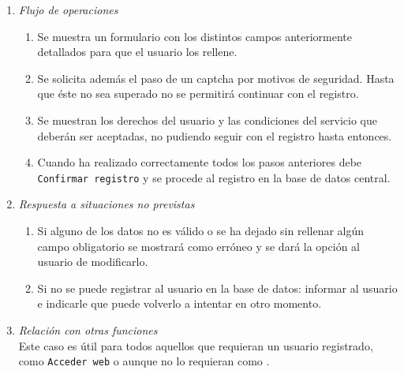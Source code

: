 \begin{enumerate}
		\item \textit{Flujo de operaciones}
			\begin{enumerate}
				\item Se muestra un formulario con los distintos campos anteriormente detallados para que el usuario los rellene. 
				\item Se solicita además el paso de un \gls{captcha} por motivos de seguridad. Hasta que éste no sea superado no se permitirá continuar con el registro.
				\item Se muestran los derechos del usuario y las condiciones del servicio que deberán ser aceptadas, no pudiendo seguir con el registro hasta entonces.
				\item Cuando ha realizado correctamente todos los pasos anteriores debe \verb|Confirmar registro| y se procede al registro en la base de datos central.
			\end{enumerate}
		\item \textit{Respuesta a situaciones no previstas}
			\begin{enumerate}
				\item Si alguno de los datos no es válido o se ha dejado sin rellenar algún campo obligatorio se mostrará como erróneo y se dará la opción al usuario de modificarlo.
				\item Si no se puede registrar al usuario en la base de datos: informar al usuario e indicarle que puede volverlo a intentar en otro momento.
			\end{enumerate}
		\item \textit{Relación con otras funciones}\\
			Este caso es útil para todos aquellos que requieran un usuario registrado, como \verb|Acceder web| o aunque no lo requieran como .
	\end{enumerate}
